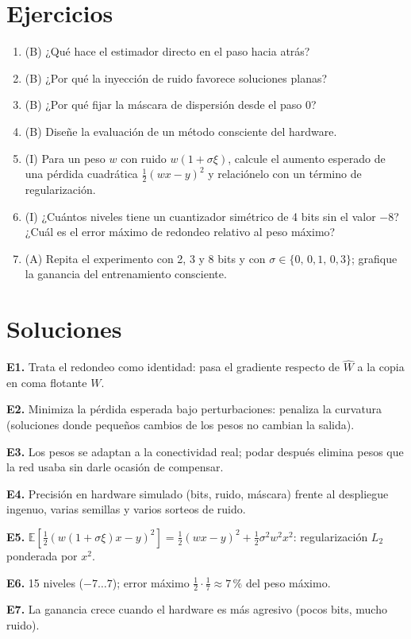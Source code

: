\documentclass[11pt,a4paper]{article}
\begin{document}
\section{Ejercicios}
\begin{enumerate}[label=\textbf{E\arabic*.}]
\item (B) ¿Qué hace el estimador directo en el paso hacia atrás?
\item (B) ¿Por qué la inyección de ruido favorece soluciones planas?
\item (B) ¿Por qué fijar la máscara de dispersión desde el paso 0?
\item (B) Diseñe la evaluación de un método consciente del hardware.
\item (I) Para un peso $w$ con ruido $w(1+\sigma\xi)$, calcule el aumento esperado de una pérdida cuadrática $\frac12(wx-y)^2$ y relaciónelo con un término de regularización.
\item (I) ¿Cuántos niveles tiene un cuantizador simétrico de 4 bits sin el valor $-8$? ¿Cuál es el error máximo de redondeo relativo al peso máximo?
\item (A) Repita el experimento con 2, 3 y 8 bits y con $\sigma\in\{0,\,0{,}1,\,0{,}3\}$; grafique la ganancia del entrenamiento consciente.
\end{enumerate}
\section{Soluciones}
\begin{solucion}
\textbf{E1.} Trata el redondeo como identidad: pasa el gradiente respecto de $\hat W$ a la copia en coma flotante $W$.

\textbf{E2.} Minimiza la pérdida esperada bajo perturbaciones: penaliza la curvatura (soluciones donde pequeños cambios de los pesos no cambian la salida).

\textbf{E3.} Los pesos se adaptan a la conectividad real; podar después elimina pesos que la red usaba sin darle ocasión de compensar.

\textbf{E4.} Precisión en hardware simulado (bits, ruido, máscara) frente al despliegue ingenuo, varias semillas y varios sorteos de ruido.

\textbf{E5.} $\mathbb E[\frac12(w(1+\sigma\xi)x-y)^2]=\frac12(wx-y)^2+\frac12\sigma^2w^2x^2$: regularización $L_2$ ponderada por $x^2$.

\textbf{E6.} 15 niveles ($-7\dots7$); error máximo $\frac12\cdot\frac17\approx7\,\%$ del peso máximo.

\textbf{E7.} La ganancia crece cuando el hardware es más agresivo (pocos bits, mucho ruido).
\end{solucion}
\end{document}
